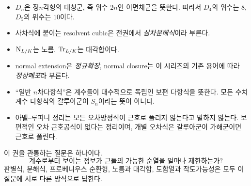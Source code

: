 \begin{itemize}
  \item $D_n$은 정$n$각형의 대칭군, 즉 위수 $2n$인 이면체군을 뜻한다. 따라서 $D_4$의 위수는 $8$, $D_5$의 위수는 $10$이다.
  \item 사차식에 붙이는 resolvent cubic은 전권에서 \emph{삼차분해식}이라 부른다.
  \item $\operatorname{N}_{L/K}$는 노름, $\operatorname{Tr}_{L/K}$는 대각합이다.
  \item normal extension은 \emph{정규확장}, normal closure는 이 시리즈의 기존 용어에 따라 \emph{정상폐포}라 부른다.
  \item ``일반 $n$차다항식''은 계수들이 대수적으로 독립인 보편 다항식을 뜻한다. 모든 수치계수 다항식의 갈루아군이 $S_n$이라는 뜻이 아니다.
  \item 아벨--루피니 정리는 모든 오차방정식이 근호로 풀리지 않는다고 말하지 않는다. 보편적인 오차 근호공식이 없다는 정리이며, 개별 오차식은 갈루아군이 가해군이면 근호로 풀린다.
\end{itemize}

\begin{keyidea}
이 권을 관통하는 질문은 하나이다.
\[
  \boxed{\text{계수로부터 보이는 정보가 근들의 가능한 순열을 얼마나 제한하는가?}}
\]
판별식, 분해식, 프로베니우스 순환형, 노름과 대각합, 도함열과 작도가능성은 모두 이 질문에 서로 다른 방식으로 답한다.
\end{keyidea}
